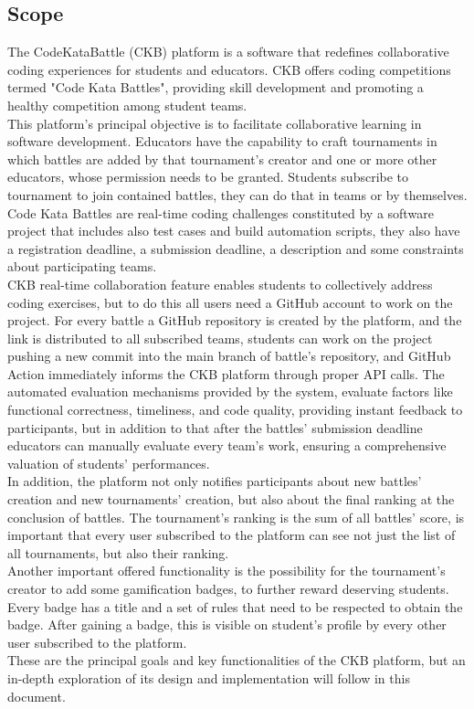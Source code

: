 \subsection{Scope}
The CodeKataBattle (CKB) platform is a software that redefines collaborative coding experiences for students and educators. CKB offers coding competitions termed "Code Kata Battles", providing skill development and promoting a healthy competition among student teams. \\
This platform's principal objective is to facilitate collaborative learning in software development. Educators have the capability to craft tournaments in which battles are added by that tournament's creator and one or more other educators, whose permission needs to be granted. Students subscribe to tournament to join contained battles, they can do that in teams or by themselves. Code Kata Battles are real-time coding challenges constituted by a software project that includes also test cases and build automation scripts, they also have a registration deadline, a submission deadline, a description and some constraints about participating teams. \\
CKB real-time collaboration feature enables students to collectively address coding exercises, but to do this all users need a GitHub account to work on the project. For every battle a GitHub repository is created by the platform, and the link is distributed to all subscribed teams, students can work on the project pushing a new commit into the main branch of battle’s repository, and GitHub Action immediately informs the CKB platform through proper API calls. The automated evaluation mechanisms provided by the system, evaluate factors like functional correctness, timeliness, and code quality, providing instant feedback to participants, but in addition to that after the battles’ submission deadline educators can manually evaluate every team’s work, ensuring a comprehensive valuation of students' performances. \\
In addition, the platform not only notifies participants about new battles’ creation and new tournaments’ creation, but also about the final ranking at the conclusion of battles.
The tournament's ranking is the sum of all battles' score, is important that every user subscribed to the platform can see not just the list of all tournaments, but also their ranking. \\
Another important offered functionality is the possibility for the tournament's creator to add some gamification badges, to further reward deserving students. Every badge has a title and a set of rules that need to be respected to obtain the badge. After gaining a badge, this is visible on student's profile by every other user subscribed to the platform. \\
These are the principal goals and key functionalities of the CKB platform, but an in-depth exploration of its design and implementation will follow in this document.


